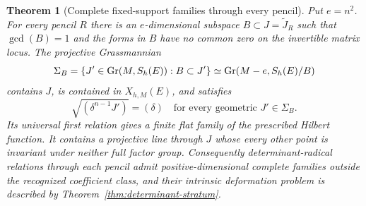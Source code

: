 \documentclass[11pt,reqno]{amsart}
\numberwithin{equation}{section}
\newtheorem{theorem}{Theorem}[section]
\theoremstyle{definition}\newtheorem{definition}[theorem]{Definition}
\theoremstyle{remark}\newtheorem{remark}[theorem]{Remark}
\begin{document}
\begin{theorem}[Complete fixed-support families through every pencil]
\label{thm:fixed-support-grassmannians}
Put \(e=n^2\).  For every pencil \(R\) there is an \(e\)-dimensional
subspace \(B\subset J=\widetilde J_R\) such that
\(\gcd(B)=1\) and the forms in \(B\) have no common zero on the
invertible matrix locus.  The projective Grassmannian
\begin{equation}\label{eq:fixed-support-grassmannian}
 \Sigma_B=\{J'\in\operatorname{Gr}(M,S_h(E)):B\subset J'\}
          \simeq\operatorname{Gr}(M-e,S_h(E)/B)
\end{equation}
contains \(J\), is contained in \(X_{h,M}(E)\), and satisfies
\begin{equation}\label{eq:fixed-radical}
              \sqrt{(\delta^{n-1}J')}=(\delta)
                         \quad\text{for every geometric }J'\in\Sigma_B.
\end{equation}
Its universal first relation gives a finite flat family of the
prescribed Hilbert function.  It contains a projective line through
\(J\) whose every other point is invariant under neither full
factor group.  Consequently determinant-radical relations through
each pencil admit positive-dimensional complete families outside
the recognized coefficient class, and their intrinsic deformation
problem is described by Theorem~\ref{thm:determinant-stratum}.
\end{theorem}
\end{document}
